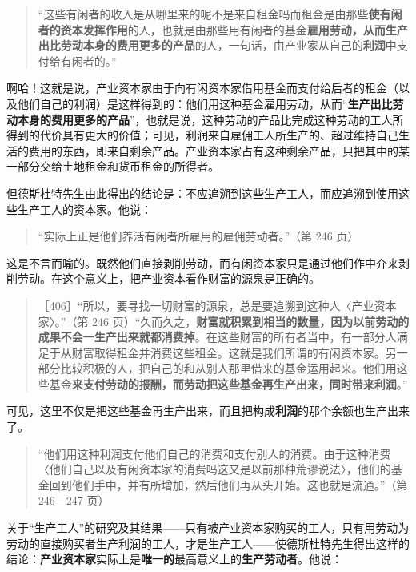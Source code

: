 \begin{quote}“这些有闲者的收入是从哪里来的呢不是来自租金吗而租金是由那些\textbf{使有闲者的资本发挥作用}的人，也就是由那些用有闲者的基金\textbf{雇用劳动，从而生产出比劳动本身的费用更多的产品}的人，一句话，由产业家从自己的\textbf{利润}中支付给有闲者的。”\end{quote}

\fontbox{~\{}啊哈！这就是说，产业资本家由于向有闲资本家借用基金而支付给后者的租金（以及他们自己的利润）是这样得到的：他们用这种基金雇用劳动，从而“\textbf{生产出比劳动本身的费用更多的产品}”，也就是说，这种劳动的产品比完成这种劳动的工人所得到的代价具有更大的价值；可见，利润来自雇佣工人所生产的、超过维持自己生活的费用的东西，即来自剩余产品。产业资本家占有这种剩余产品，只把其中的某一部分交给土地租金和货币租金的所得者。\fontbox{\}~}

但德斯杜特先生由此得出的结论是：不应追溯到这些生产工人，而应追溯到使用这些生产工人的资本家。他说：

\begin{quote}“实际上正是他们养活有闲者所雇用的雇佣劳动者。”（第 246 页）\end{quote}

这是不言而喻的。既然他们直接剥削劳动，而有闲资本家只是通过他们作中介来剥削劳动。在这个意义上，把产业资本看作财富的源泉是正确的。

\begin{quote}［406］“所以，要寻找一切财富的源泉，总是要追溯到这种人〈产业资本家〉。”（第 246 页）“久而久之，\textbf{财富就积累到相当的数量，因为以前劳动的成果不会一生产出来就都消费掉}。在这些财富的所有者当中，有一部分人满足于从财富取得租金并消费这些租金。这就是我们所谓的有闲资本家。另一部分比较积极的人，把自己的和从别人那里借来的基金运用起来。他们用这些基金\textbf{来支付劳动的报酬，而劳动把这些基金再生产出来，同时带来利润}。”\end{quote}

\fontbox{~\{}可见，这里不仅是把这些基金再生产出来，而且把构成\textbf{利润}的那个余额也生产出来了。\fontbox{\}~}

\begin{quote}“他们用这种利润支付他们自己的消费和支付别人的消费。由于这种消费〈他们自己以及有闲资本家的消费吗这又是以前那种荒谬说法〉，他们的基金回到他们手中，并有所增加，然后他们再从头开始。这也就是流通。”（第 246—247 页）\end{quote}

关于“生产工人”的研究及其结果——只有被产业资本家购买的工人，只有用劳动为劳动的直接购买者生产利润的工人，才是生产工人——使德斯杜特先生得出这样的结论：\textbf{产业资本家}实际上是\textbf{唯一的}最高意义上的\textbf{生产劳动者}。他说：


